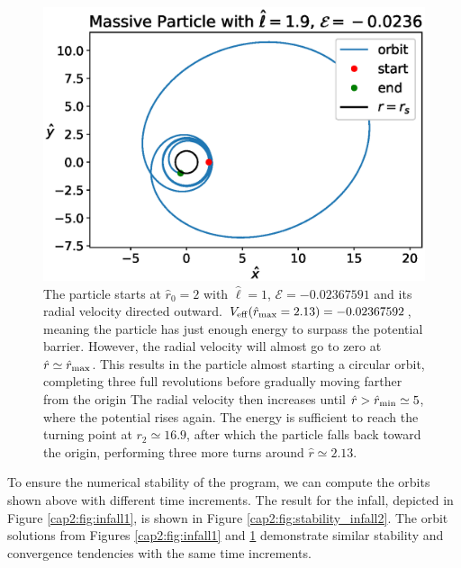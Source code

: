 \begin{figure}[h!]
    \centering
    \includegraphics[width= 0.64 \textwidth]{Figures/chapter2/volevi.eps}
    \caption{The particle starts at $\hat r_0 = 2$ with $\hat \ell = 1$,
    $\mathcal E = -0.02367591$ and its radial velocity directed outward.
    $V_{\rm eff} (\hat r_{\rm max} = 2.13) = -0.02367592$, meaning the particle
    has just enough energy to surpass the potential barrier.
    However, the radial velocity will almost go to zero at
    $\hat r \simeq \hat r_{\rm max}$.
    This results in the particle almost starting a circular orbit, completing
    three full revolutions before gradually moving farther from the origin
    The radial velocity then increases until
    $\hat r > \hat r_{\rm min} \simeq 5$, where the potential rises again.
    The energy is sufficient to reach the turning point at $r_2 \simeq 16.9$,
    after which the particle falls back toward the origin, performing three more
    turns around $\hat r \simeq 2.13$.}
    \label{cap2:fig:volevi}
\end{figure}

To ensure the numerical stability of the program, we can compute the orbits
shown above with different time increments.
The result for the infall, depicted in Figure \ref{cap2:fig:infall1}, is shown
in Figure \ref{cap2:fig:stability_infall2}.
The orbit solutions from Figures \ref{cap2:fig:infall1} and
\ref{cap2:fig:volevi} demonstrate similar stability and convergence tendencies
with the same time increments.

